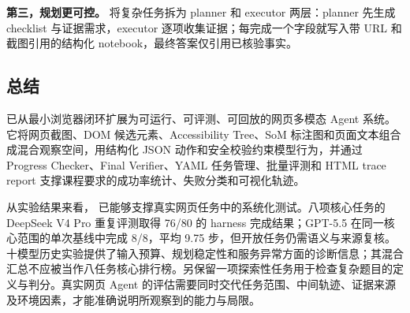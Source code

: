 \textbf{第三，规划更可控。} 将复杂任务拆为 planner 和 executor 两层：planner 先生成 checklist 与证据需求，executor 逐项收集证据；每完成一个字段就写入带 URL 和截图引用的结构化 notebook，最终答案仅引用已核验事实。

\subsection{总结}

\projectname{} 已从最小浏览器闭环扩展为可运行、可评测、可回放的网页多模态 Agent 系统。它将网页截图、DOM 候选元素、Accessibility Tree、SoM 标注图和页面文本组合成混合观察空间，用结构化 JSON 动作和安全校验约束模型行为，并通过 Progress Checker、Final Verifier、YAML 任务管理、批量评测和 HTML trace report 支撑课程要求的成功率统计、失败分类和可视化轨迹。

从实验结果来看，\projectname{} 已能够支撑真实网页任务中的系统化测试。八项核心任务的 DeepSeek V4 Pro 重复评测取得 76/80 的 harness 完成结果；GPT-5.5 在同一核心范围的单次基线中完成 8/8，平均 9.75 步，但开放任务仍需语义与来源复核。十模型历史实验提供了输入预算、规划稳定性和服务异常方面的诊断信息；其混合汇总不应被当作八任务核心排行榜。另保留一项探索性任务用于检查复杂题目的定义与判分。真实网页 Agent 的评估需要同时交代任务范围、中间轨迹、证据来源及环境因素，才能准确说明所观察到的能力与局限。
